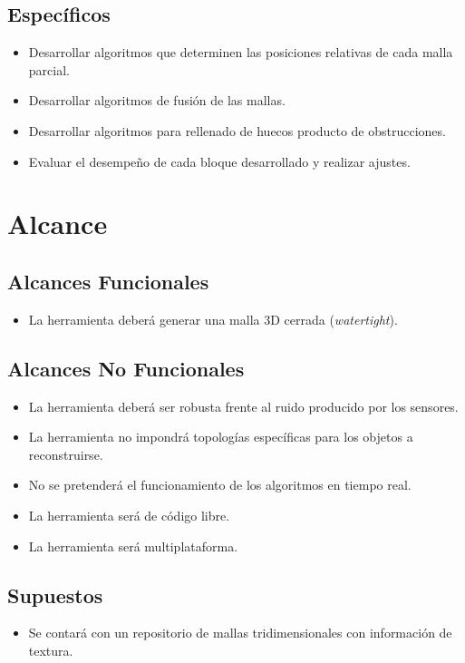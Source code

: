		\subsection{Específicos}
		\begin{itemize}
			\item Desarrollar algoritmos que determinen las posiciones relativas de cada malla parcial.
			\item Desarrollar algoritmos de fusión de las mallas.
			\item Desarrollar algoritmos para rellenado de huecos producto de obstrucciones.
			\item Evaluar el desempeño de cada bloque desarrollado y realizar ajustes.
		\end{itemize}

	\section{Alcance}
		\subsection{Alcances Funcionales}
		\begin{itemize}
			\item La herramienta deberá generar una malla 3D cerrada (\emph{watertight}).
		\end{itemize}
		\subsection{Alcances No Funcionales}
		\begin{itemize}
			\item La herramienta deberá ser robusta frente al ruido producido por los sensores.
			\item La herramienta no impondrá topologías específicas para los objetos a reconstruirse.
			\item No se pretenderá el funcionamiento de los algoritmos en tiempo real.
			\item La herramienta será de código libre.
			\item La herramienta será multiplataforma.
		\end{itemize}
		\subsection{Supuestos}
		\begin{itemize}
			\item Se contará con un repositorio de mallas tridimensionales con información de textura.
		\end{itemize}
